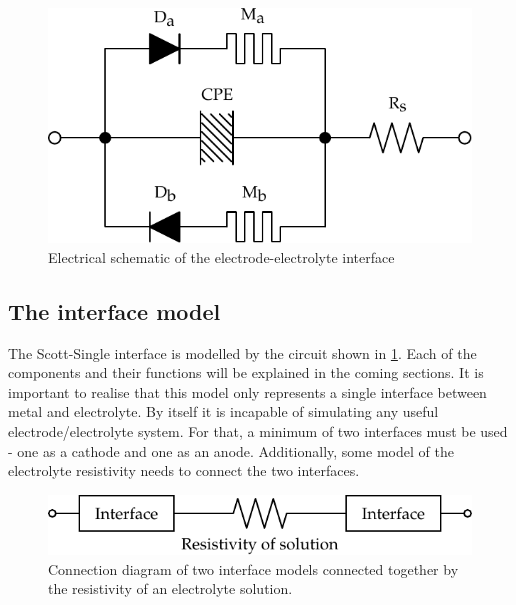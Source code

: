   \begin{figure}
    \centering
    \includegraphics{content/pt2/07-InterfaceModel/graphics/interfaceSchematic}
    \caption{\label{fig:pt2-interfaceSchematic}Electrical schematic of the electrode-electrolyte interface}
  \end{figure}

  \subsection{The interface model}

    The Scott-Single interface is modelled by the circuit shown in \cref{fig:pt2-interfaceSchematic}.
    Each of the components and their functions will be explained in the coming sections.
    It is important to realise that this model only represents a single interface between metal and electrolyte.
    By itself it is incapable of simulating any useful electrode/electrolyte system.
    For that, a minimum of two interfaces must be used - one as a cathode and one as an anode.
    Additionally, some model of the electrolyte resistivity needs to connect the two interfaces.

    \begin{figure}
      \centering
      \includegraphics{content/pt2/07-InterfaceModel/graphics/simpleElectrodeElectrolyteModel}
      \caption{\label{fig:pt2-simpleElectrodeElectrolyteModel}Connection diagram of two interface models connected together by the resistivity of an electrolyte solution.}
    \end{figure}

